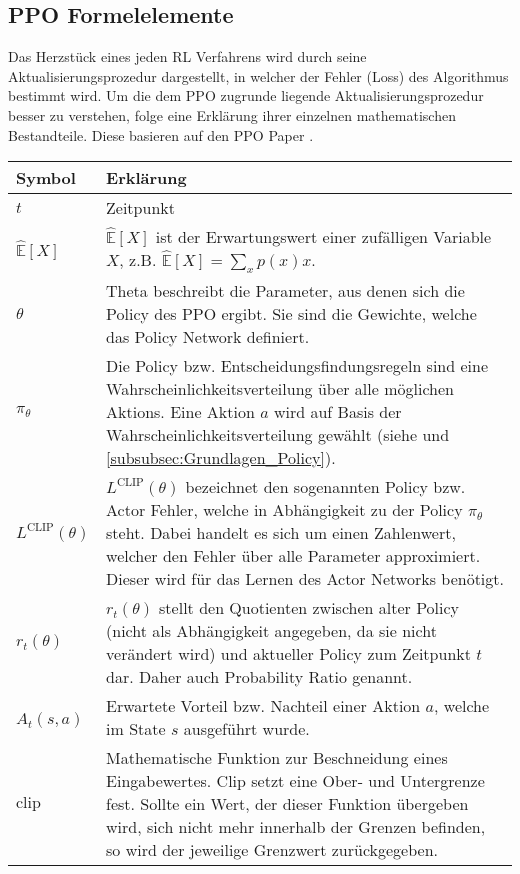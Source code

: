 \subsection{PPO Formelelemente}
Das Herzstück eines jeden RL Verfahrens wird durch seine Aktualisierungsprozedur dargestellt, in welcher der Fehler (Loss) des Algorithmus bestimmt wird. Um die dem PPO zugrunde liegende Aktualisierungsprozedur besser zu verstehen, folge eine Erklärung ihrer einzelnen mathematischen Bestandteile. 
Diese basieren auf den PPO Paper \citep{PPO}.
\begin{longtable}[H]{|p{1.5cm}|p{\linewidth - 2.5cm}|}
	\hline
	Symbol & Erklärung \\
	\hline
	$t$ & Zeitpunkt \\
	\hline
	$\mathbb{\hat{E}}[X]$ & $\mathbb{\hat{E}}[X]$ ist der Erwartungswert einer zufälligen Variable $X$, z.B. $\mathbb{\hat{E}}[X] = \sum_{x}p(x)x$. \citep[Summary of Notation S. xv]{Sutton1998} \\
	\hline
	$\theta$ & Theta beschreibt die Parameter, aus denen sich die Policy des PPO ergibt. Sie sind die Gewichte, welche das Policy Network definiert. \\
	\hline
	$\pi_{\theta}$ & Die Policy bzw. Entscheidungsfindungsregeln sind eine Wahrscheinlichkeitsverteilung über alle möglichen Aktions. Eine Aktion $a$ wird auf Basis der Wahrscheinlichkeitsverteilung gewählt (siehe \citep[Summary of Notation S. xvi]{Sutton1998} und \autoref{subsubsec:Grundlagen_Policy}). \\
	\hline
	$L^\text{CLIP} (\theta)$ & $L^\text{CLIP} (\theta)$ bezeichnet den sogenannten Policy bzw. Actor Fehler, welche in Abhängigkeit zu der Policy $\pi_{\theta}$ steht. Dabei handelt es sich um einen Zahlenwert, welcher den Fehler über alle Parameter approximiert. Dieser wird für das Lernen des Actor Networks benötigt. \\
	\hline
	$r_{t}(\theta)$ & $r_{t}(\theta)$ stellt den Quotienten zwischen alter Policy (nicht als Abhängigkeit angegeben, da sie nicht verändert wird) und aktueller Policy zum Zeitpunkt $t$ dar. Daher auch Probability Ratio genannt. \\
	\hline
	$\hat{A}_{t}(s, a)$ & Erwartete Vorteil bzw. Nachteil einer Aktion $a$, welche im State $s$ ausgeführt wurde. \\
	\hline
	$\text{clip}$ & Mathematische Funktion zur Beschneidung eines Eingabewertes. Clip setzt eine Ober- und Untergrenze fest. Sollte ein Wert, der dieser Funktion übergeben wird, sich nicht mehr innerhalb der Grenzen befinden, so wird der jeweilige Grenzwert zurückgegeben. \\

\end{longtable}
